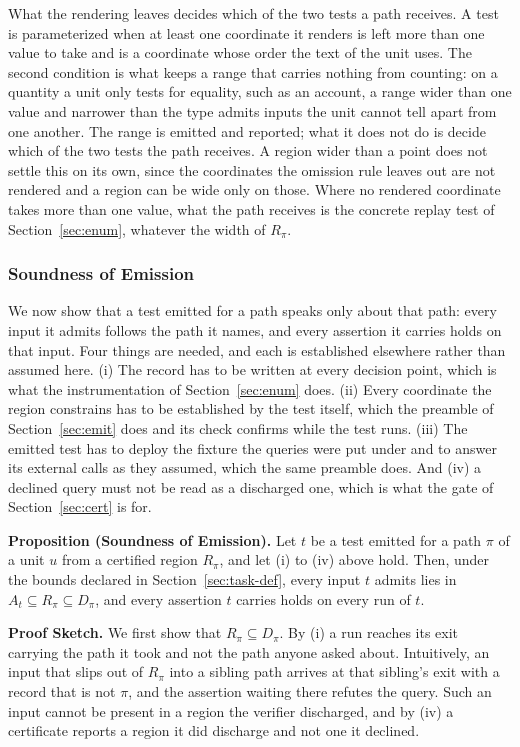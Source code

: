 \documentclass[manuscript,anonymous]{acmart}
\begin{document}
What the rendering leaves decides which of the two tests a path receives. A test
is parameterized when at least one coordinate it renders is left more than one
value to take and is a coordinate whose order the text of the unit uses. The
second condition is what keeps a range that carries nothing from counting: on a
quantity a unit only tests for equality, such as an account, a range wider than
one value and narrower than the type admits inputs the unit cannot tell apart
from one another. The range is emitted and reported; what it does not do is
decide which of the two tests the path receives. A region wider than a point does not settle this on its own,
since the coordinates the omission rule leaves out are not rendered and a region
can be wide only on those. Where no rendered coordinate takes more than one
value, what the path receives is the concrete replay test of
Section~\ref{sec:enum}, whatever the width of $R_\pi$.

\subsubsection{Soundness of Emission}\label{sec:sound-emit}
We now show that a test emitted for a path speaks only about that path: every
input it admits follows the path it names, and every assertion it carries holds
on that input. Four things are needed, and each is established elsewhere rather
than assumed here. (i) The record has to be written at every decision point,
which is what the instrumentation of Section~\ref{sec:enum} does. (ii) Every
coordinate the region constrains has to be established by the test itself,
which the preamble of Section~\ref{sec:emit} does and its check confirms while
the test runs. (iii) The emitted test has to deploy the fixture the queries
were put under and to answer its external calls as they assumed, which the same
preamble does. And (iv) a declined query must not be read as a discharged one,
which is what the gate of Section~\ref{sec:cert} is for.

\textbf{Proposition (Soundness of Emission).}
Let $t$ be a test emitted for a path $\pi$ of a unit $u$ from a certified region
$R_\pi$, and let (i) to (iv) above hold. Then, under the bounds declared in
Section~\ref{sec:task-def}, every input $t$ admits lies in
$A_t \subseteq R_\pi \subseteq D_\pi$, and every assertion $t$ carries holds on
every run of $t$.

\noindent\textbf{Proof Sketch.}
We first show that $R_\pi \subseteq D_\pi$. By (i) a run reaches its exit carrying
the path it took and not the path anyone asked about. Intuitively, an input that
slips out of $R_\pi$ into a sibling path arrives at that sibling's exit with a
record that is not $\pi$, and the assertion waiting there refutes the query. Such
an input cannot be present in a region the verifier discharged, and by (iv) a
certificate reports a region it did discharge and not one it declined.
\end{document}
